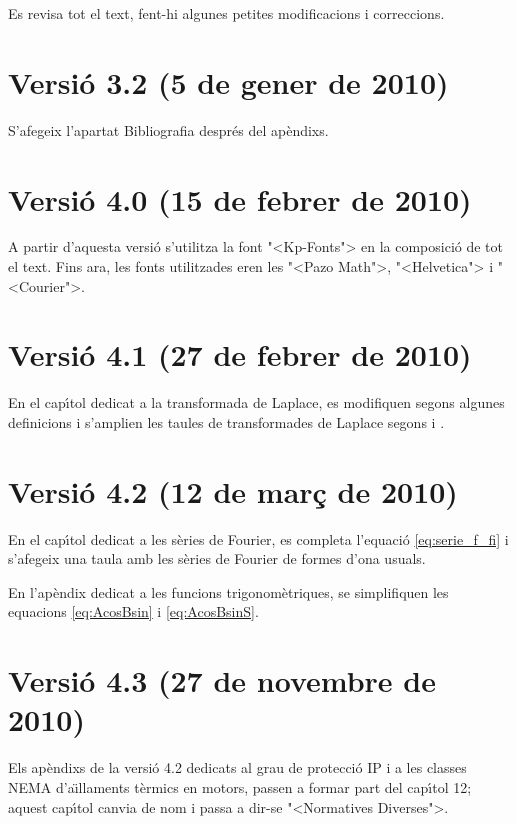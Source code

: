 Es revisa tot el text, fent-hi algunes petites modificacions i
correccions.

\section*{Versi\'{o} 3.2 (5 de gener de 2010)}
S'afegeix l'apartat Bibliografia despr\'{e}s del ap\`{e}ndixs.


\section*{Versi\'{o} 4.0 (15 de febrer de 2010)}
A partir d'aquesta versi\'{o} s'utilitza la font {"<}Kp-Fonts{">} en la composici\'{o} de tot el text. Fins ara, les fonts utilitzades eren les {"<}Pazo Math{">}, {"<}Helvetica{">} i {"<}Courier{">}.


\section*{Versi\'{o} 4.1 (27 de febrer de 2010)}
En el cap\'{\i}tol dedicat a la transformada de Laplace, es modifiquen segons \cite{SCH} algunes definicions  i s'amplien les taules de transformades de Laplace segons \cite{RASd} i \cite{SCH}.

\section*{Versi\'{o} 4.2 (12 de mar\c{c} de 2010)}
En el cap\'{\i}tol dedicat a les s\`{e}ries de Fourier, es completa l'equaci\'{o} \eqref{eq:serie_f_fi} i s'afegeix una taula amb les s\`{e}ries de Fourier de formes d'ona usuals.

En l'ap\`{e}ndix dedicat a les funcions trigonom\`{e}triques, se simplifiquen les equacions \eqref{eq:AcosBsin} i \eqref{eq:AcosBsinS}.

\section*{Versi\'{o} 4.3 (27 de novembre de 2010)}
Els ap\`{e}ndixs de la versi\'{o} 4.2 dedicats al grau de protecci\'{o} IP i  a les classes NEMA d'a\"{\i}llaments t\`{e}rmics en motors, passen a formar part del cap\'{\i}tol 12; aquest cap\'{\i}tol canvia de nom i passa a dir-se {"<}Normatives Diverses{">}.

